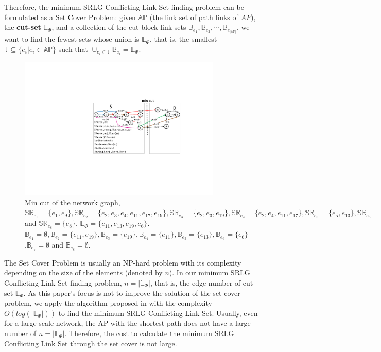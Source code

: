 Therefore, the minimum SRLG Conflicting Link Set finding problem can be formulated as a Set Cover Problem: given $\mathbb{AP}$ (the link set of path links of $AP$), the \textbf{cut-set} $\mathbb{L}_{\Phi}$,  and a collection of the cut-block-link sets ${\mathbb{B}_{{e_1}}},{\mathbb{B}_{{e_2}}}, \cdots ,{\mathbb{B}_{{e_{|\mathbb{AP}|}}}}$, we want to find the fewest sets whose union is $\mathbb{L}_{\Phi}$, that is, the smallest $\mathbb{T} \subseteq \{e_i| e_i\in \mathbb{AP}\}$ such that ${ \cup_{e_i \in \mathbb{T}}}{\mathbb{B}_{e_i}} = \mathbb{L}_{\Phi}$.


\begin{figure}[tp]
  \centering
  \includegraphics[width=3.8in]{figures/MinCutStarGraph}
  \caption{Min cut of the network graph, $\mathbb{SR}_{e_1}=\{e_1, e_9\},\mathbb{SR}_{e_2}=\{e_2,e_3,e_4, e_{11},e_{17},e_{19}\},\mathbb{SR}_{e_3}=\{e_2,e_3, e_{19}\},\mathbb{SR}_{e_4}=\{e_2,e_4, e_{11},e_{17}\},\mathbb{SR}_{e_5}=\{e_5, e_{13}\},\mathbb{SR}_{e_6}=\{e_6\},\mathbb{SR}_{e_7}=\{e_7\} $ and $\mathbb{SR}_{e_8}=\{e_8\}$. $\mathbb{L}_{\Phi}=\{e_{11},e_{13},e_{19},e_{6}\}$. $\mathbb{B}_{e_1}=\emptyset,\mathbb{B}_{e_2}=\{e_{11},e_{19}\},\mathbb{B}_{e_3}=\{e_{19}\},\mathbb{B}_{e_4}=\{e_{11}\},\mathbb{B}_{e_5}=\{e_{13}\},\mathbb{B}_{e_6}=\{e_6\}$,$\mathbb{B}_{e_7}=\emptyset$ and $\mathbb{B}_{e_8}=\emptyset$.}\label{fig:MinCutStarGraph}
  \label{fig:MinCutStarGraph}
\end{figure}

The Set Cover Problem is usually an NP-hard problem with its complexity depending on the size of the elements (denoted by $n$). In our minimum SRLG Conflicting Link Set finding problem, $n=|\mathbb{L}_{\Phi}|$, that is, the edge number of cut set $\mathbb{L}_{\Phi}$. As this paper's focus is not to improve the solution of the set cover problem, we apply the algorithm proposed in \cite{chvatal1979greedy} with the complexity $O(log(|\mathbb{L}_{\Phi}|))$  to find the minimum SRLG Conflicting Link Set. Usually, even for a large scale network, the  AP with the shortest path does not have a large number of $n=|\mathbb{L}_{\Phi}|$. Therefore, the cost to calculate the minimum SRLG Conflicting Link Set through the set cover is not large.

